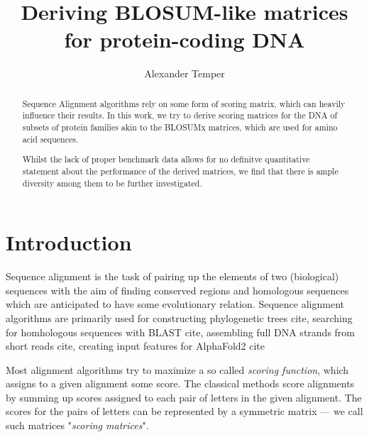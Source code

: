 \documentclass{article}
\title{Deriving BLOSUM-like matrices for protein-coding DNA}
\author{Alexander Temper}
\begin{document}
\maketitle

\begin{abstract}
    Sequence Alignment algorithms rely on some form of scoring matrix,
    which can heavily influence their results. In this work, we try to derive
    scoring matrices for the DNA of subsets of protein families akin to
    the BLOSUMx matrices, which are used for amino acid sequences.

    Whilst the lack of proper benchmark data allows for no definitve quantitative
    statement about the performance of the derived matrices, we find that there is ample diversity among them to be further investigated.
\end{abstract}



\section*{Introduction} Sequence alignment is the task of pairing up the
elements of two (biological) sequences with the aim of finding conserved
regions and homologous sequences which are anticipated to have some
evolutionary relation. Sequence alignment algorithms are primarily used for
constructing phylogenetic trees cite, searching for homhologous sequences with BLAST cite,
assembling full DNA strands from short reads cite, creating input features for
AlphaFold2 cite

Most alignment algorithms try to maximize a so called \emph{scoring function},
which assigns to a given alignment some score. The classical methods score
alignments by summing up scores assigned to each pair of letters in the given
alignment. The scores for the pairs of letters can be represented by a
symmetric matrix --- we call such matrices "\emph{scoring matrices}".
\end{document}
